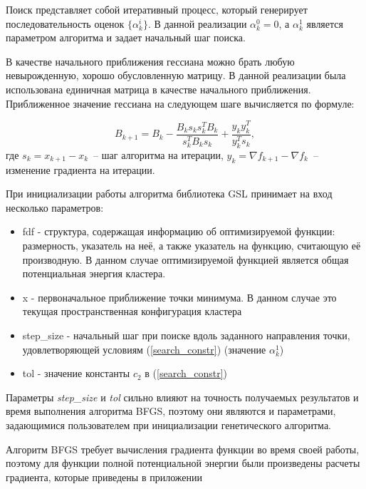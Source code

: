 Поиск представляет собой итеративный процесс, который генерирует последовательность оценок
$\lbrace \alpha_{k}^{i} \rbrace$. В данной реализации $\alpha_{k}^{0} = 0$, а $\alpha_{k}^{1}$
является параметром алгоритма и задает начальный шаг поиска.

В качестве начального приближения гессиана можно брать любую невырожденную, хорошо обусловленную матрицу.
В данной реализации была использована единичная матрица в качестве начального приближения.
Приближенное значение гессиана на следующем шаге вычисляется по формуле:

\begin{equation}
  B_{k+1} = B_k - \frac{B_k s_k s_{k}^{T} B_k}{s_{k}^{T} B_k s_k} + \frac{y_k y_k^{T}}{y_k^{T} s_k},
\end{equation}
где $s_k = x_{k+1} - x_k$~-- шаг алгоритма на итерации,
$y_k = \nabla f_{k+1} - \nabla f_{k}$~-- изменение градиента на итерации.

При инициализации работы алгоритма библиотека GSL принимает на вход несколько параметров:

\begin{itemize}
  \item{fdf - структура, содержащая информацию об оптимизируемой функции: размерность, указатель на неё,
    а также указатель на функцию, считающую её производную. В данном случае оптимизируемой функцией
    является общая потенциальная энергия кластера.}
  \item{x   - первоначальное приближение точки минимума. В данном случае это текущая пространственная
    конфигурация кластера}
  \item{step\_size - начальный шаг при поиске вдоль заданного направления точки, удовлетворяющей условиям
    (\ref{search_constr}) (значение $\alpha_{k}^{1}$)}
  \item{tol - значение константы $c_2$ в (\ref{search_constr}})
\end{itemize}

Параметры {\it step\_size} и {\it tol} сильно влияют на точность получаемых результатов и время выполнения
алгоритма BFGS, поэтому они являются и параметрами, задающимися пользователем при инициализации
генетического алгоритма.

Алгоритм BFGS требует вычисления градиента функции во время своей работы, поэтому для функции полной
потенциальной энергии были произведены расчеты градиента, которые приведены в приложении %
